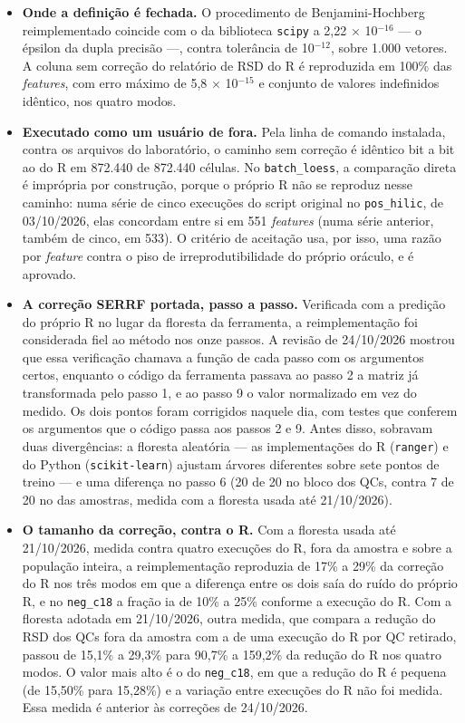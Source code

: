 \begin{itemize}
\item \textbf{Onde a definição é fechada.} O procedimento de Benjamini-Hochberg reimplementado coincide com o da biblioteca \texttt{scipy} a 2,22 $\times$ 10$^{-16}$ --- o épsilon da dupla precisão ---, contra tolerância de 10$^{-12}$, sobre 1.000 vetores. A coluna sem correção do relatório de RSD do R é reproduzida em 100\% das \textit{features}, com erro máximo de 5,8 $\times$ 10$^{-15}$ e conjunto de valores indefinidos idêntico, nos quatro modos.
\item \textbf{Executado como um usuário de fora.} Pela linha de comando instalada, contra os arquivos do laboratório, o caminho sem correção é idêntico bit a bit ao do R em 872.440 de 872.440 células. No \texttt{batch\_\allowbreak{}loess}, a comparação direta é imprópria por construção, porque o próprio R não se reproduz nesse caminho: numa série de cinco execuções do script original no \texttt{pos\_\allowbreak{}hilic}, de 03/10/2026, elas concordam entre si em 551 \textit{features} (numa série anterior, também de cinco, em 533). O critério de aceitação usa, por isso, uma razão por \textit{feature} contra o piso de irreprodutibilidade do próprio oráculo, e é aprovado.
\item \textbf{A correção SERRF portada, passo a passo.} Verificada com a predição do próprio R no lugar da floresta da ferramenta, a reimplementação foi considerada fiel ao método nos onze passos. A revisão de 24/10/2026 mostrou que essa verificação chamava a função de cada passo com os argumentos certos, enquanto o código da ferramenta passava ao passo 2 a matriz já transformada pelo passo 1, e ao passo 9 o valor normalizado em vez do medido. Os dois pontos foram corrigidos naquele dia, com testes que conferem os argumentos que o código passa aos passos 2 e 9. Antes disso, sobravam duas divergências: a floresta aleatória --- as implementações do R (\texttt{ranger}) e do Python (\texttt{scikit-\allowbreak{}learn}) ajustam árvores diferentes sobre sete pontos de treino --- e uma diferença no passo 6 (20 de 20 no bloco dos QCs, contra 7 de 20 no das amostras, medida com a floresta usada até 21/10/2026).
\item \textbf{O tamanho da correção, contra o R.} Com a floresta usada até 21/10/2026, medida contra quatro execuções do R, fora da amostra e sobre a população inteira, a reimplementação reproduzia de 17\% a 29\% da correção do R nos três modos em que a diferença entre os dois saía do ruído do próprio R, e no \texttt{neg\_\allowbreak{}c18} a fração ia de 10\% a 25\% conforme a execução do R. Com a floresta adotada em 21/10/2026, outra medida, que compara a redução do RSD dos QCs fora da amostra com a de uma execução do R por QC retirado, passou de 15,1\% a 29,3\% para 90,7\% a 159,2\% da redução do R nos quatro modos. O valor mais alto é o do \texttt{neg\_\allowbreak{}c18}, em que a redução do R é pequena (de 15,50\% para 15,28\%) e a variação entre execuções do R não foi medida. Essa medida é anterior às correções de 24/10/2026.

\end{itemize}
